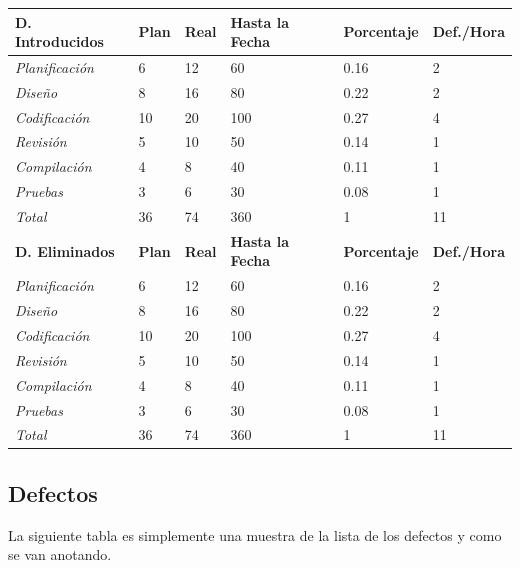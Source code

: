 \documentclass[a4paper,12pt,openany,oneside]{book}
\begin{document}
\newpage
\begin{tabular}{| l | l | l | l | l | l |}
\hline
\textbf{D. Introducidos} & \textbf{Plan} & \textbf{Real} & \textbf{Hasta la Fecha} & \textbf{Porcentaje} & \textbf{Def./Hora} \\
\hline
\textit{Planificación} &  6 & 12 & 60 & 0.16 & 2\\
\hline
\textit{Diseño} &		  8 & 16 & 80 & 0.22 & 2\\
\hline
\textit{Codificación} &  10 & 20 &100 & 0.27 & 4\\
\hline
\textit{Revisión} &       5 & 10 & 50 & 0.14 & 1\\
\hline
\textit{Compilación} &    4 &  8 & 40 & 0.11 & 1\\
\hline
\textit{Pruebas} &        3 &  6 & 30 & 0.08 & 1\\
\hline
\textit{Total} &         36 & 74 & 360& 1 & 11 \\
\hline
\textbf{D. Eliminados} & \textbf{Plan} & \textbf{Real} & \textbf{Hasta la Fecha} & \textbf{Porcentaje} & \textbf{Def./Hora} \\
\hline
\textit{Planificación} &  6 & 12 & 60 & 0.16 & 2\\
\hline
\textit{Diseño} &		  8 & 16 & 80 & 0.22 & 2\\
\hline
\textit{Codificación} &  10 & 20 &100 & 0.27 & 4\\
\hline
\textit{Revisión} &       5 & 10 & 50 & 0.14 & 1\\
\hline
\textit{Compilación} &    4 &  8 & 40 & 0.11 & 1\\
\hline
\textit{Pruebas} &        3 &  6 & 30 & 0.08 & 1\\
\hline
\textit{Total} &         36 & 74 & 360& 1 & 11 \\
\hline
\end{tabular}
\subsection{Defectos}
La siguiente tabla es simplemente una muestra de la lista de los defectos y como se van anotando.
\end{document}
